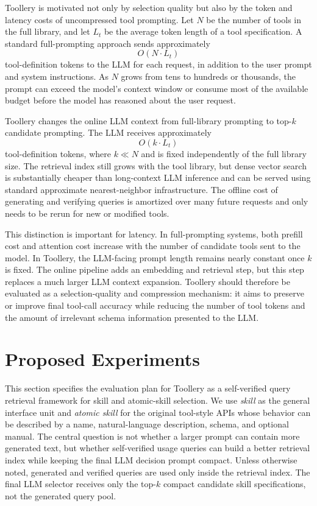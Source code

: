 \documentclass[11pt]{article}
\begin{document}
Toollery is motivated not only by selection quality but also by the token and latency costs of uncompressed tool prompting. Let $N$ be the number of tools in the full library, and let $L_t$ be the average token length of a tool specification. A standard full-prompting approach sends approximately
\begin{equation}
    O(N \cdot L_t)
\end{equation}
tool-definition tokens to the LLM for each request, in addition to the user prompt and system instructions. As $N$ grows from tens to hundreds or thousands, the prompt can exceed the model's context window or consume most of the available budget before the model has reasoned about the user request.

Toollery changes the online LLM context from full-library prompting to top-$k$ candidate prompting. The LLM receives approximately
\begin{equation}
    O(k \cdot L_t)
\end{equation}
tool-definition tokens, where $k \ll N$ and is fixed independently of the full library size. The retrieval index still grows with the tool library, but dense vector search is substantially cheaper than long-context LLM inference and can be served using standard approximate nearest-neighbor infrastructure. The offline cost of generating and verifying queries is amortized over many future requests and only needs to be rerun for new or modified tools.

This distinction is important for latency. In full-prompting systems, both prefill cost and attention cost increase with the number of candidate tools sent to the model. In Toollery, the LLM-facing prompt length remains nearly constant once $k$ is fixed. The online pipeline adds an embedding and retrieval step, but this step replaces a much larger LLM context expansion. Toollery should therefore be evaluated as a selection-quality and compression mechanism: it aims to preserve or improve final tool-call accuracy while reducing the number of tool tokens and the amount of irrelevant schema information presented to the LLM.
\section{Proposed Experiments}
\label{sec:experiments}

This section specifies the evaluation plan for Toollery as a self-verified query retrieval framework for
skill and atomic-skill selection. We use
\emph{skill} as the general interface unit and \emph{atomic skill} for the original
tool-style APIs whose behavior can be described by a name, natural-language
description, schema, and optional manual. The central question is not whether a
larger prompt can contain more generated text, but whether self-verified usage
queries can build a better retrieval index while keeping the final LLM decision
prompt compact. Unless otherwise noted, generated and verified queries are used
only inside the retrieval index. The final LLM selector receives only the top-$k$
compact candidate skill specifications, not the generated query pool.
\end{document}
